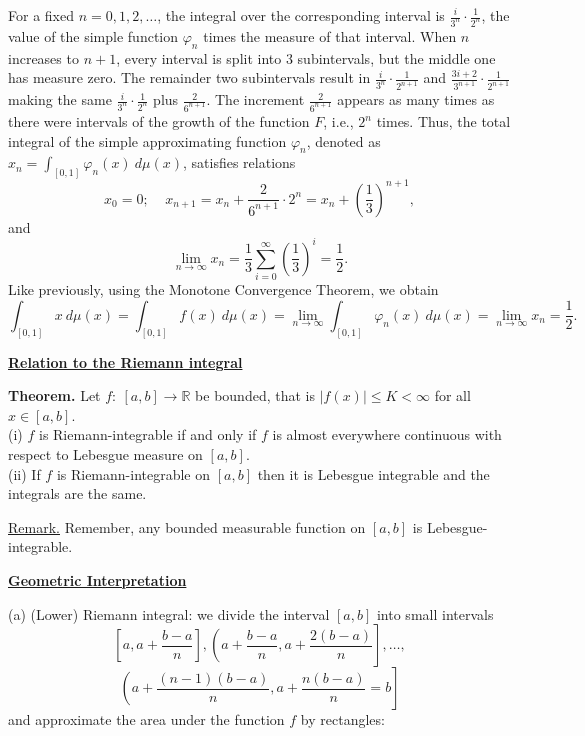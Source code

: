 \documentclass[a4paper,10pt]{article}
\def\RR{\mathbb{R}}
\newcommand{\1}[1]{\mathbf{1}_{\{#1\}}}
\begin{document}
For a fixed $n=0,1,2,\ldots$, the integral over the corresponding interval is $\frac{i}{3^n}\cdot \frac{1}{2^n}$, the value of the simple function $\varphi_n$ times the measure of that interval. When $n$ increases to $n+1$, every interval is split into 3 subintervals, but the middle one has measure zero. The remainder two subintervals result in $\frac{i}{3^n}\cdot\frac{1}{2^{n+1}}$ and $\frac{3i+2}{3^{n+1}}\cdot\frac{1}{2^{n+1}}$ making the same $\frac{i}{3^n}\cdot \frac{1}{2^n}$ plus $\frac{2}{6^{n+1}}$. The increment $\frac{2}{6^{n+1}}$ appears as many times as there were intervals of the growth of the function $F$, i.e., $2^n$ times. Thus, the total integral of the simple approximating function $\varphi_n$, denoted as $x_n=\int_{[0,1]} \varphi_n(x)~d\mu(x)$, satisfies relations
$$x_0=0;~~~~~x_{n+1}=x_n+\frac{2}{6^{n+1}} \cdot 2^n=x_n+(\frac{1}{3})^{n+1},$$
and
$$\lim_{n\to\infty}x_n =\frac{1}{3}\sum_{i=0}^\infty (\frac{1}{3})^i=\frac{1}{2}.$$
Like previously, using the Monotone Convergence Theorem, we obtain
$$\int_{[0,1]} x~d\mu(x)=\int_{[0,1]} f(x)~d\mu(x)=\lim_{n\to\infty} \int_{[0,1]} \varphi_n(x)~d\mu(x)=\lim_{n\to\infty} x_n=\frac{1}{2}.$$
\blacksquare \vspace{3mm}

\begin{center}\bf\underline{Relation to the Riemann integral} \end{center}\vspace{3mm}

{\bf Theorem.} Let $f:~[a,b]\to\RR$ be bounded, that is $|f(x)|\le K<\infty$ for all $x\in[a,b]$.\\
(i) $f$ is Riemann-integrable if and only if $f$ is almost everywhere continuous with respect to Lebesgue measure on $[a,b]$.\\
(ii) If $f$ is Riemann-integrable on $[a,b]$ then it is Lebesgue integrable and the integrals are the same.
\vspace{3mm}

\underline{Remark.} Remember, any bounded measurable function on $[a,b]$ is Lebesgue-integrable.\vspace{3mm}

\begin{center}\bf\underline{ Geometric Interpretation} \end{center} \vspace{3mm}

(a) (Lower) Riemann integral: we divide the interval $[a,b]$ into small intervals
  $$\left[a,a+\frac{b-a}{n}\right],\left(a+\frac{b-a}{n},a+\frac{2(b-a)}{n}\right],\ldots,$$
  $$\left(a+\frac{(n-1)(b-a)}{n},a+\frac{n(b-a)}{n}=b\right]$$
and approximate the area under the function $f$ by rectangles: \vspace{5cm}
\end{document}
